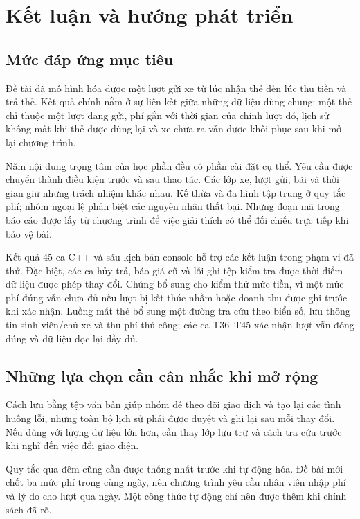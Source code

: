 \chapter{Kết luận và hướng phát triển}
\label{chap:conclusion}

\section{Mức đáp ứng mục tiêu}
Đề tài đã mô hình hóa được một lượt gửi xe từ lúc nhận thẻ đến lúc thu tiền và trả thẻ. Kết quả chính nằm ở sự liên kết giữa những dữ liệu dùng chung: một thẻ chỉ thuộc một lượt đang gửi, phí gắn với thời gian của chính lượt đó, lịch sử không mất khi thẻ được dùng lại và xe chưa ra vẫn được khôi phục sau khi mở lại chương trình.

Năm nội dung trọng tâm của học phần đều có phần cài đặt cụ thể. Yêu cầu được chuyển thành điều kiện trước và sau thao tác. Các lớp xe, lượt gửi, bãi và thời gian giữ những trách nhiệm khác nhau. Kế thừa và đa hình tập trung ở quy tắc phí; nhóm ngoại lệ phân biệt các nguyên nhân thất bại. Những đoạn mã trong báo cáo được lấy từ chương trình để việc giải thích có thể đối chiếu trực tiếp khi bảo vệ bài.

Kết quả 45 ca C++ và sáu kịch bản console hỗ trợ các kết luận trong phạm vi đã thử. Đặc biệt, các ca hủy trả, báo giá cũ và lỗi ghi tệp kiểm tra được thời điểm dữ liệu được phép thay đổi. Chúng bổ sung cho kiểm thử mức tiền, vì một mức phí đúng vẫn chưa đủ nếu lượt bị kết thúc nhầm hoặc doanh thu được ghi trước khi xác nhận. Luồng mất thẻ bổ sung một đường tra cứu theo biển số, lưu thông tin sinh viên/chủ xe và thu phí thủ công; các ca T36--T45 xác nhận lượt vẫn đóng đúng và dữ liệu đọc lại đầy đủ.

\section{Những lựa chọn cần cân nhắc khi mở rộng}
Cách lưu bằng tệp văn bản giúp nhóm dễ theo dõi giao dịch và tạo lại các tình huống lỗi, nhưng toàn bộ lịch sử phải được duyệt và ghi lại sau mỗi thay đổi. Nếu dùng với lượng dữ liệu lớn hơn, cần thay lớp lưu trữ và cách tra cứu trước khi nghĩ đến việc đổi giao diện.

Quy tắc qua đêm cũng cần được thống nhất trước khi tự động hóa. Đề bài mới chốt ba mức phí trong cùng ngày, nên chương trình yêu cầu nhân viên nhập phí và lý do cho lượt qua ngày. Một công thức tự động chỉ nên được thêm khi chính sách đã rõ.

